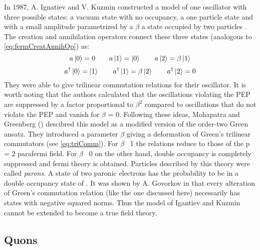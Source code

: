 In 1987, A. Ignatiev and V. Kuzmin constructed a model of one oscillator with three possible states: a vacuum state with no occupancy, a one particle state and with a small amplitude parametrized by a  $\beta$ a state occupied by two particles \cite{Ignatiev1987}. The creation and annihilation operators connect these three states (analogous to \ref{eq:fermCreatAnnihOp}) as:
\begin{equation}
 a \ket{0} = 0 \hspace{2em} a \ket{1} = \ket{0} \hspace{2em}  a \ket{2} = \beta \ket{1}
\end{equation} 
\begin{equation}
 a^{\dag} \ket{0} = \ket{1} \hspace{2em}  a^{\dag} \ket{1} = \beta \ket{2} \hspace{2em}  a^{\dag} \ket{2} = 0
\end{equation} 
They were able to give trilinear commutation relations for their oscillator. It is worth noting that the authors calculated that the oscillations violating the PEP are suppressed by a factor proportional to $\beta^{2}$ compared to oscillations that do not violate the PEP and vanish for $\beta$ = 0. Following these ideas, Mohapatra and Greenberg (\cite{Greenberg2000}) descibred this model as a modified version of the order-two Green ansatz. They introduced a parameter $\beta$ giving a deformation of Green's trilinear commutators (see \ref{eq:triComm}). For $\beta$ \textrightarrow \ 1 the relations reduce to those of the p = 2 parafermi field. For $\beta$ \textrightarrow \ 0 on the other hand, double occupancy is completely suppressed and fermi theory is obtained. Particles described by this theory were called \textit{parons}. A state of two paronic electrons has the probability to be in a double occupancy state of \betatwo. It was shown by A. Govorkov in \cite{Govorkov1989} that every alteration of Green's commutation relation (like the one discussed here) necessarily has states with negative squared norms. Thus the model of Igantiev and Kuzmin cannot be extended to become a true field theory.

\subsection{Quons}

